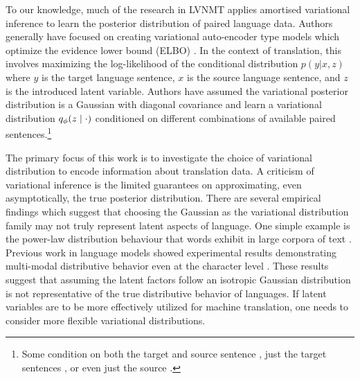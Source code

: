 To our knowledge, much of the research in \ac{LVNMT} applies amortised variational inference to learn the posterior distribution of paired language data. Authors generally have focused on creating variational auto-encoder type models which optimize the evidence lower bound (ELBO) \cite{ kingma2014autoencodingVB, rezende2014stochasticBackprop}. In the context of translation, this involves maximizing the log-likelihood of the conditional distribution $p(y | x, z)$ where $y$ is the target language sentence, $x$ is the source language sentence, and $z$ is the introduced latent variable. Authors have assumed the variational posterior distribution is a Gaussian with diagonal covariance and learn a variational distribution $q_{\phi}(z\; | \;{\cdot})$ conditioned on different combinations of available paired sentences.\footnote{ Some condition on both the target and source sentence \cite{Zhang2016VNMT,eikema2018AEVNMT,harshil2018GNMT},  just the target sentences \cite{schulz2018StochasticDecoder}, or even just the source \cite{eikema2018AEVNMT}.} 


The primary focus of this work is to investigate the choice of variational distribution to encode information about translation data. A criticism of variational inference is the limited guarantees on approximating, even asymptotically, the true posterior distribution. There are several empirical findings which suggest that choosing the Gaussian as the variational distribution family may not truly represent latent aspects of language. One simple example is the power-law distribution behaviour that words exhibit in large corpora of text \cite{koehnSMT2010}. Previous work in language models showed experimental results demonstrating multi-modal distributive behavior even at the character level \cite{ziegler2019LatentNFforDiscrete}. These results suggest that assuming the latent factors follow an isotropic Gaussian distribution is not representative of the true distributive behavior of languages. If latent variables are to be more effectively utilized for machine translation, one needs to consider more flexible variational distributions. 

